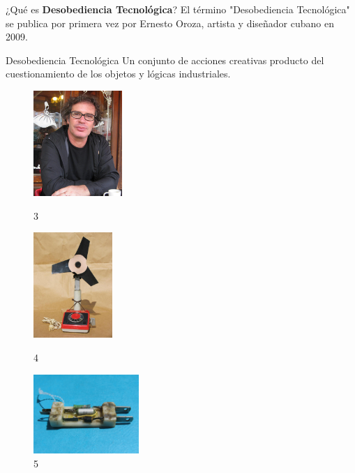 \documentclass[spanish]{beamer}
\begin{document}
\begin{frame}{¿Qué es \textbf{Desobediencia Tecnológica}?}
    El término "Desobediencia Tecnológica" se publica por primera vez por Ernesto Oroza, artista y diseñador cubano en 2009.
    \begin{block}{Desobediencia Tecnológica}
        Un conjunto de acciones creativas producto del cuestionamiento de los objetos y lógicas industriales.
    \end{block}
    \vspace{0.3cm}

    \centering
    \begin{figure}
            \includegraphics[height=4cm]{img/ernestooroza.jpg}
            \vspace*{-3mm}
            \caption{ 3}
        \endminipage\hfill
            \includegraphics[height=4cm]{img/inventos/ventilador.jpg}
            \vspace*{-3mm}
            \caption{ 4}
        \endminipage\hfill
            \includegraphics[height=3cm]{img/inventos/battery_charger.jpg}
            \vspace*{-3mm}
            \caption{ 5}
        \endminipage\hfill
    \end{figure}
\end{frame}
\end{document}
